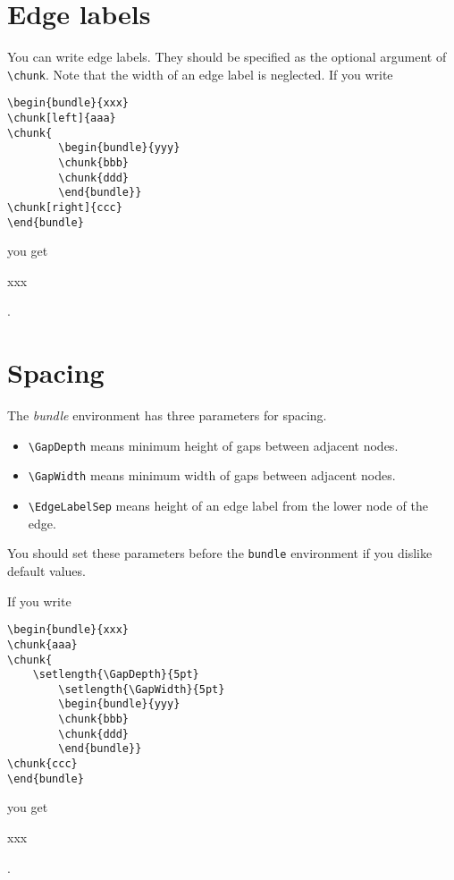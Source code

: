 \section{Edge labels}

You can write edge labels. They should be specified as the optional
argument of \verb|\chunk|. Note that the width of an edge label
is neglected. If you write
\drawwith{\drawline}
\begin{verbatim}
\begin{bundle}{xxx}
\chunk[left]{aaa}
\chunk{
        \begin{bundle}{yyy}
        \chunk{bbb}
        \chunk{ddd}
        \end{bundle}}
\chunk[right]{ccc}
\end{bundle}
\end{verbatim}
you get
\begin{bundle}{xxx}
\end{bundle}.


\section{Spacing}

The {\it bundle} environment
has three parameters for spacing.

\begin{itemize}

\item \verb|\GapDepth| means minimum height of gaps between
adjacent nodes.

\item \verb|\GapWidth| means minimum width of gaps between
adjacent nodes.

\item \verb|\EdgeLabelSep| means height of an edge label
from the lower node of the edge.

\end{itemize}

You should set these parameters before the {\tt bundle} environment
if you dislike default values.

If you write
\begin{verbatim}
\begin{bundle}{xxx}
\chunk{aaa}
\chunk{
	\setlength{\GapDepth}{5pt}
        \setlength{\GapWidth}{5pt}
        \begin{bundle}{yyy}
        \chunk{bbb}
        \chunk{ddd}
        \end{bundle}}
\chunk{ccc}
\end{bundle}
\end{verbatim}
you get
\begin{bundle}{xxx}
\end{bundle}.






